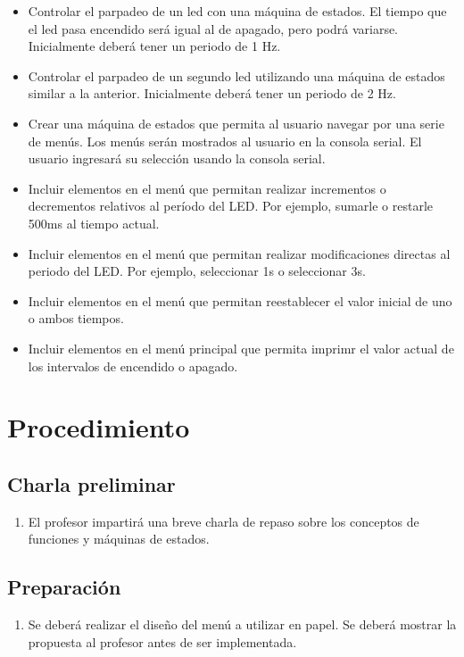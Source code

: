 \documentclass[12pt,letterpaper]{IEEEtran}
\begin{document}
\begin{itemize}
	\item Controlar el parpadeo de un led con una máquina de estados. El tiempo que el led pasa encendido será igual al de apagado, pero podrá variarse. Inicialmente deberá tener un periodo de 1 Hz.
	\item Controlar el parpadeo de un segundo led utilizando una máquina de estados similar a la anterior. Inicialmente deberá tener un periodo de 2 Hz.
	

	\item Crear una máquina de estados que permita al usuario navegar por una serie de menús. Los menús serán mostrados al usuario en la consola serial. El usuario ingresará su selección usando la consola serial.
	\item Incluir elementos en el menú que permitan realizar incrementos o decrementos relativos al período del LED. Por ejemplo, sumarle o restarle 500ms al tiempo actual.
	\item Incluir elementos en el menú que permitan realizar modificaciones directas al periodo del LED. Por ejemplo, seleccionar 1s o seleccionar 3s.
	\item Incluir elementos en el menú que permitan reestablecer el valor inicial de uno o ambos tiempos.
	\item Incluir elementos en el menú principal que permita imprimr el valor actual de los intervalos de encendido o apagado.
\end{itemize}

\section{Procedimiento}

\subsection{Charla preliminar}

\begin{enumerate}
	\item El profesor impartirá una breve charla de repaso sobre los conceptos de funciones y máquinas de estados.
\end{enumerate}


\subsection{Preparación}

\begin{enumerate}[resume]
	\item Se deberá realizar el diseño del menú a utilizar en papel. Se deberá mostrar la propuesta al profesor antes de ser implementada.
\end{enumerate}
\end{document}
